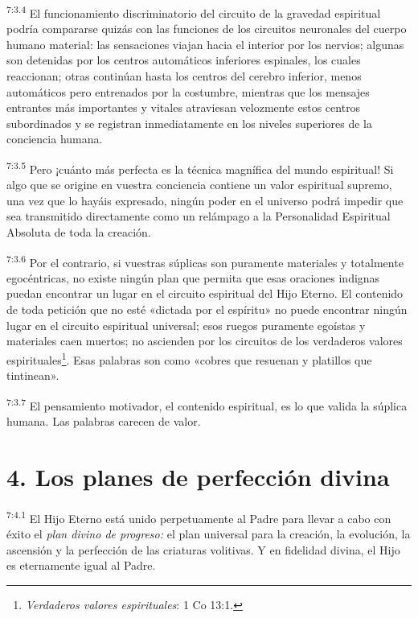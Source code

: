 \par
\textsuperscript{7:3.4} El funcionamiento discriminatorio del circuito de la gravedad espiritual podría compararse quizás con las funciones de los circuitos neuronales del cuerpo humano material: las sensaciones viajan hacia el interior por los nervios; algunas son detenidas por los centros automáticos inferiores espinales, los cuales reaccionan; otras continúan hasta los centros del cerebro inferior, menos automáticos pero entrenados por la costumbre, mientras que los mensajes entrantes más importantes y vitales atraviesan velozmente estos centros subordinados y se registran inmediatamente en los niveles superiores de la conciencia humana.

\par
\textsuperscript{7:3.5} Pero ¡cuánto más perfecta es la técnica magnífica del mundo espiritual! Si algo que se origine en vuestra conciencia contiene un valor espiritual supremo, una vez que lo hayáis expresado, ningún poder en el universo podrá impedir que sea transmitido directamente como un relámpago a la Personalidad Espiritual Absoluta de toda la creación.

\par
\textsuperscript{7:3.6} Por el contrario, si vuestras súplicas son puramente materiales y totalmente egocéntricas, no existe ningún plan que permita que esas oraciones indignas puedan encontrar un lugar en el circuito espiritual del Hijo Eterno. El contenido de toda petición que no esté «dictada por el espíritu» no puede encontrar ningún lugar en el circuito espiritual universal; esos ruegos puramente egoístas y materiales caen muertos; no ascienden por los circuitos de los verdaderos valores espirituales\footnote{\textit{Verdaderos valores espirituales}: 1 Co 13:1.}. Esas palabras son como «cobres que resuenan y platillos que tintinean».

\par
\textsuperscript{7:3.7} El pensamiento motivador, el contenido espiritual, es lo que valida la súplica humana. Las palabras carecen de valor.

\section*{4. Los planes de perfección divina}
\par
\textsuperscript{7:4.1} El Hijo Eterno está unido perpetuamente al Padre para llevar a cabo con éxito el \textit{plan divino de progreso:} el plan universal para la creación, la evolución, la ascensión y la perfección de las criaturas volitivas. Y en fidelidad divina, el Hijo es eternamente igual al Padre.


